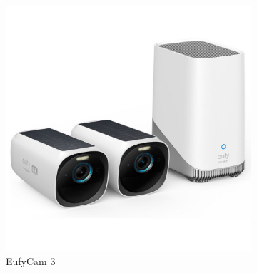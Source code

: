 \begin{figure}[H]
    \centering
    \begin{subfigure}{0.2\textwidth}
        \centering
        \includegraphics[width=\textwidth]{Images/Products/eufycam3.jpg}
        \caption{\centering EufyCam 3}
        \label{fig:eufycam_3}
    \end{subfigure}
    \hspace{30pt}%
    \begin{subfigure}{0.2\textwidth}
        \centering

\end{subfigure}
\end{figure}

